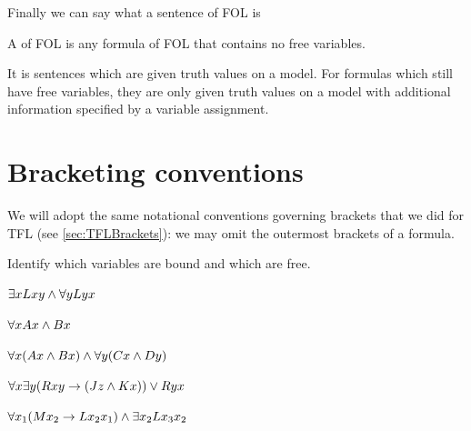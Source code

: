 Finally we can say what a sentence of FOL is
	\begin{definition}
		A  of FOL is any formula of FOL that contains no free variables.
	\end{definition}
	
It is sentences which are given truth values on a model. For formulas which still have free variables, they are only given truth values on a model with additional information specified by a variable assignment. 






\section{Bracketing conventions}

We will adopt the same notational conventions governing brackets that we did for TFL (see \cref{sec:TFLBrackets}):  we may omit the outermost brackets of a formula.





\begin{practiceproblems}
\problempart
\label{pr:freeFOL}
Identify which variables are bound and which are free.
\begin{problemslist}
\item $\exists x Lxy \mathbin{\wedge} \forall y Lyx$
\item $\forall x Ax \mathbin{\wedge} Bx$
\item $\forall x (Ax \mathbin{\wedge} Bx) \mathbin{\wedge} \forall y(Cx \mathbin{\wedge} Dy)$
\item $\forall x\exists y(Rxy \rightarrow (Jz \mathbin{\wedge} Kx)) \vee Ryx$
\item $\forall x_1(Mx_2 \rightarrow Lx_2x_1) \mathbin{\wedge} \exists x_2 Lx_3x_2$
\end{problemslist}


\end{practiceproblems}






